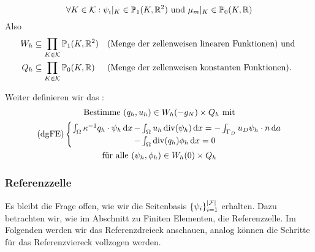 \begin{remark}
	
	\[	\forall K \in \mathcal{K}:\psi_i|_K \in \mathbb{P}_1(K,\mathbb{R}^2) \text{ und } \mu_m|_K \in \mathbb{P}_0(K,\mathbb{R}) \]
	Also
	\begin{align*}	
	W_h &\subseteq \prod_{K \in \mathcal{K}} \mathbb{P}_1(K,\mathbb{R}^2) &&\text{(Menge der zellenweisen linearen Funktionen) und }\\
	Q_h &\subseteq \prod_{K \in \mathcal{K}} \mathbb{P}_0(K,\mathbb{R}) &&\text{(Menge der zellenweisen konstanten Funktionen)}. 
	\end{align*}	
\end{remark}

\begin{define}
	Weiter definieren wir das :
	\begin{gather*}
		\text{Bestimme } (q_h,u_h) \in W_h(-g_N) \times Q_h \text{ mit}\\
		\operatorname{(dgFE)}\begin{cases}
			\int_{\Omega} \kappa ^{-1} q_h \cdot \psi_h \mathop{}\!\mathrm{d} x \mkern-15mu &- \int_{\Omega} u_h \operatorname{div}(\psi_h) \mathop{}\!\mathrm{d} x = - \int_{\Gamma_D} u_D \psi_h \cdot n \mathop{}\!\mathrm{d} a\\
			&- \int_{\Omega} \operatorname{div}(q_h) \phi_h \mathop{}\!\mathrm{d} x = 0
		\end{cases} \\
		\text{für alle } (\psi_h, \phi_h) \in W_h(0) \times Q_h
	\end{gather*}
\end{define}
\subsubsection{Referenzzelle}

Es bleibt die Frage offen, wie wir die Seitenbasis $ \{ \psi_i \}_{i=1}^{\abs{\mathcal{F}}} $ erhalten. Dazu betrachten wir, wie im Abschnitt zu Finiten Elementen, die Referenzzelle. Im Folgenden werden wir das Referenzdreieck anschauen, analog können die Schritte für das Referenzviereck vollzogen werden. 

